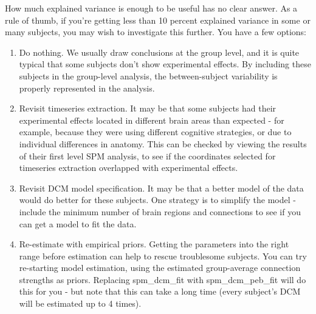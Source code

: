\documentclass{article}
\begin{document}
How much explained variance is enough to be useful has no clear answer. As a rule of thumb, if you're getting less than 10 percent explained variance in some or many subjects, you may wish to investigate this further. You have a few options:

\begin{enumerate}
\item Do nothing. We usually draw conclusions at the group level, and it is quite typical that some subjects don't show experimental effects. By including these subjects in the group-level analysis, the between-subject variability is properly represented in the analysis.
\item Revisit timeseries extraction. It may be that some subjects had their experimental effects located in different brain areas than expected - for example, because they were using different cognitive strategies, or due to individual differences in anatomy. This can be checked by viewing the results of their first level SPM analysis, to see if the coordinates  selected for timeseries extraction overlapped with experimental effects. 
\item Revisit DCM model specification. It may be that a better model of the data would do better for these subjects. One strategy is to simplify the model - include the minimum number of brain regions and connections to see if you can get a model to fit the data.
\item Re-estimate with empirical priors. Getting the parameters into the right range before estimation can help to rescue troublesome subjects. You can try re-starting model estimation, using the estimated group-average connection strengths as priors. Replacing spm\_dcm\_fit with spm\_dcm\_peb\_fit will do this for you - but note that this can take a long time (every subject's DCM will be estimated up to 4 times).

\end{enumerate}
\end{document}
